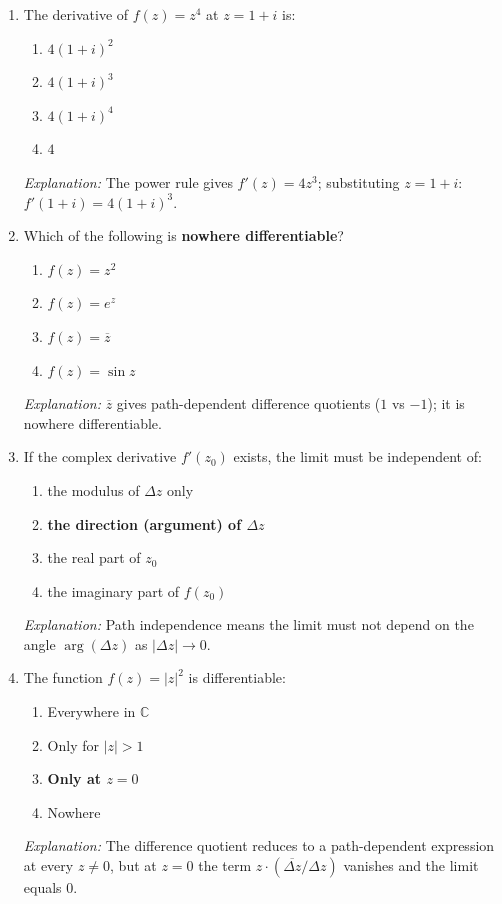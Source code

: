 \documentclass[12pt,a4paper]{article}
\begin{document}
\begin{enumerate}[label=\textbf{MCQ \arabic*.}, leftmargin=3em]

\item The derivative of $f(z)=z^4$ at $z=1+i$ is:
\begin{enumerate}[label=(\alph*)]
  \item $4(1+i)^2$
  \item \textbf{$4(1+i)^3$}
  \item $4(1+i)^4$
  \item $4$
\end{enumerate}
\textit{Explanation:} The power rule gives $f'(z)=4z^3$; substituting $z=1+i$:
$f'(1+i)=4(1+i)^3$.

\medskip
\item Which of the following is \textbf{nowhere differentiable}?
\begin{enumerate}[label=(\alph*)]
  \item $f(z) = z^2$
  \item $f(z) = e^z$
  \item \textbf{$f(z) = \overline{z}$}
  \item $f(z) = \sin z$
\end{enumerate}
\textit{Explanation:} $\overline{z}$ gives path-dependent difference quotients
($1$ vs $-1$); it is nowhere differentiable.

\medskip
\item If the complex derivative $f'(z_0)$ exists, the limit must be independent of:
\begin{enumerate}[label=(\alph*)]
  \item the modulus of $\Delta z$ only
  \item \textbf{the direction (argument) of $\Delta z$}
  \item the real part of $z_0$
  \item the imaginary part of $f(z_0)$
\end{enumerate}
\textit{Explanation:} Path independence means the limit must not depend on the
angle $\arg(\Delta z)$ as $|\Delta z| \to 0$.

\medskip
\item The function $f(z) = |z|^2$ is differentiable:
\begin{enumerate}[label=(\alph*)]
  \item Everywhere in $\mathbb{C}$
  \item Only for $|z| > 1$
  \item \textbf{Only at $z = 0$}
  \item Nowhere
\end{enumerate}
\textit{Explanation:} The difference quotient reduces to a path-dependent expression
at every $z \neq 0$, but at $z=0$ the term $z\cdot(\overline{\Delta z}/\Delta z)$
vanishes and the limit equals $0$.


\end{enumerate}
\end{document}
